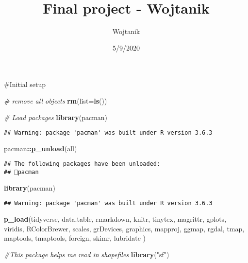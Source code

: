 \documentclass[]{article}
\title{Final project - Wojtanik}
\author{Wojtanik}
\date{5/9/2020}
\newenvironment{Shaded}{\begin{snugshade}}{\end{snugshade}}
\newcommand{\CommentTok}[1]{\textcolor[rgb]{0.56,0.35,0.01}{\textit{#1}}}
\newcommand{\DataTypeTok}[1]{\textcolor[rgb]{0.13,0.29,0.53}{#1}}
\newcommand{\KeywordTok}[1]{\textcolor[rgb]{0.13,0.29,0.53}{\textbf{#1}}}
\newcommand{\NormalTok}[1]{#1}
\newcommand{\OperatorTok}[1]{\textcolor[rgb]{0.81,0.36,0.00}{\textbf{#1}}}
\newcommand{\StringTok}[1]{\textcolor[rgb]{0.31,0.60,0.02}{#1}}
\begin{document}
\maketitle

\#Initial setup

\begin{Shaded}
\begin{Highlighting}[]
\CommentTok{\# remove all objects}
\KeywordTok{rm}\NormalTok{(}\DataTypeTok{list=}\KeywordTok{ls}\NormalTok{())}

\CommentTok{\# Load packages }
\KeywordTok{library}\NormalTok{(pacman)}
\end{Highlighting}
\end{Shaded}

\begin{verbatim}
## Warning: package 'pacman' was built under R version 3.6.3
\end{verbatim}

\begin{Shaded}
\begin{Highlighting}[]
\NormalTok{pacman}\OperatorTok{::}\KeywordTok{p\_unload}\NormalTok{(all)}
\end{Highlighting}
\end{Shaded}

\begin{verbatim}
## The following packages have been unloaded:
## pacman
\end{verbatim}

\begin{Shaded}
\begin{Highlighting}[]
\KeywordTok{library}\NormalTok{(pacman)}
\end{Highlighting}
\end{Shaded}

\begin{verbatim}
## Warning: package 'pacman' was built under R version 3.6.3
\end{verbatim}

\begin{Shaded}
\begin{Highlighting}[]
\KeywordTok{p\_load}\NormalTok{(tidyverse, data.table, rmarkdown, knitr, tinytex, magrittr,}
\NormalTok{       gplots, viridis, RColorBrewer, scales, grDevices, graphics,}
\NormalTok{       mapproj, ggmap, rgdal, tmap, maptools, tmaptools, foreign, skimr, lubridate}
\NormalTok{       )}

\CommentTok{\#This package helps me read in shapefiles}
\KeywordTok{library}\NormalTok{(}\StringTok{"sf"}\NormalTok{)}
\end{Highlighting}
\end{Shaded}
\end{document}

